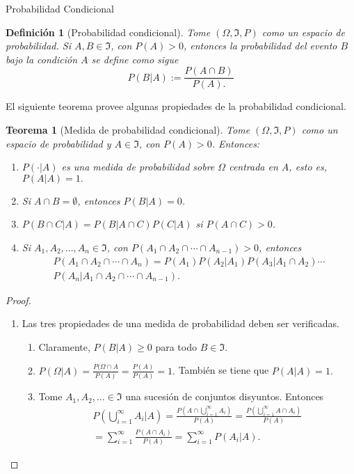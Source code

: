 \documentclass{beamer}
\newtheorem{defi}{Definición}[section]
\newtheorem{theo}{Teorema}[section]
\begin{document}
	\begin{frame}[allowframebreaks]{Probabilidad Condicional}
		\begin{defi}[Probabilidad condicional]
			Tome $(\Omega, \Im, P)$ como un espacio de probabilidad. Si $A,B\in\Im$, con $P(A)>0$, entonces la probabilidad del evento $B$ bajo la condición $A$ se define como sigue
			$$P(B|A):=\frac{P(A\cap B)}{P(A).}$$
		\end{defi}
		El siguiente teorema provee algunas propiedades de la probabilidad condicional.
		\begin{theo}[Medida de probabilidad condicional]
			Tome $(\Omega, \Im, P)$ como un espacio de probabilidad y $A\in\Im$, con $P(A)>0$. Entonces:
			\begin{enumerate}
				\item $P(\cdot | A)$ es una medida de probabilidad sobre $\Omega$ centrada en $A$, esto es, $P(A|A)=1.$
				\item Si $A\cap B=\emptyset$, entonces $P(B|A)=0$.
				\item $P(B\cap C |A)=P(B|A\cap C)P(C|A)$ si $P(A\cap C)>0$.
				\item Si $A_1,A_2,\dots,A_n\in\Im$, con $P(A_1\cap A_2\cap\cdots\cap A_{n-1})>0$, entonces
				\begin{align*}
				P(A_1\cap A_2\cap\cdots\cap A_n)=P(A_1)P(A_2|A_1)P(A_3|A_1\cap A_2)\cdots\\ P(A_n|A_1\cap A_2\cap \cdots\cap A_{n-1}).
				\end{align*}
			\end{enumerate}
		\end{theo}
		
		\begin{proof}
			\begin{enumerate}
				\item Las tres propiedades de una medida de probabilidad deben ser verificadas.
				\begin{enumerate}
					\item Claramente, $P(B|A)\geq0$ para todo $B\in\Im$.
					\item $P(\Omega | A)=\frac{P(\Omega\cap A}{P(A)}=\frac{P(A)}{P(A)}=1.$ También se tiene que $P(A|A)=1.$
					\item Tome $A_1,A_2,\dots\in\Im$ una sucesión de conjuntos disyuntos. Entonces
					\begin{align*}
					P\left(\bigcup_{i=1}^\infty A_i | A\right)=\frac{P\left(A\cap \bigcup_{i=1}^\infty A_i\right)}{P(A)}=\frac{P\left(\bigcup_{i=1}^\infty A\cap A_i\right)}{P(A)}\\
					=\sum_{i=1}^\infty \frac{P(A\cap A_i)}{P(A)}=\sum_{i=1}^\infty P(A_i | A).
					\end{align*}
				\end{enumerate}
			\end{enumerate}
		\end{proof}
		

\end{frame}
\end{document}
